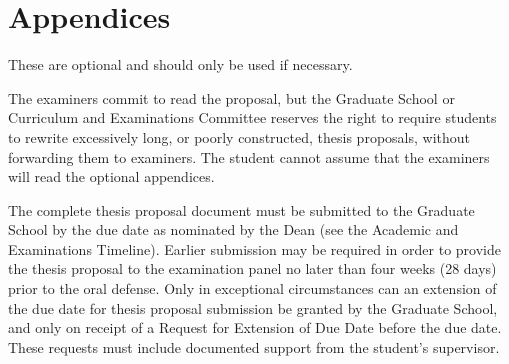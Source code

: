 

\chapter{Appendices} \label{appA}

These are optional and should only be used if necessary. 

The examiners commit to read the proposal, but the Graduate School or Curriculum
and Examinations Committee reserves the right to require students to rewrite excessively long, or poorly constructed, thesis proposals, without forwarding them to examiners. The student cannot assume that the examiners will read the optional appendices.

The complete thesis proposal document must be submitted to the Graduate School by the due date as nominated by the Dean (see the Academic and Examinations Timeline).  Earlier submission may be required in order to provide the thesis proposal to the examination panel no later than four weeks (28 days) prior to the oral defense.  Only in exceptional circumstances can an extension of the due date for thesis proposal submission be granted by the Graduate School, and only on receipt of a Request for Extension of Due Date before the due date.   These requests must include documented support from the student’s supervisor.